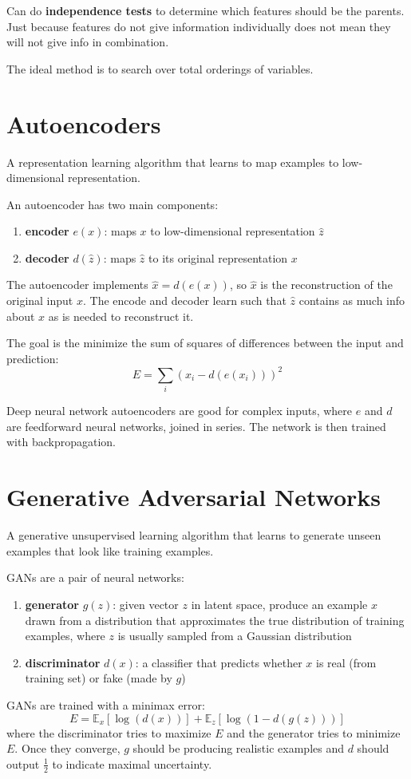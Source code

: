 \documentclass[11pt]{article}
\begin{document}
Can do \textbf{independence tests} to determine which features should be the parents.
Just because features do not give information individually does not mean they will not give info
in combination.

The ideal method is to search over total orderings of variables.
\section{Autoencoders}
\label{sec:org0c1732d}
A representation learning algorithm that learns to map examples to low-dimensional representation.

An autoencoder has two main components:
\begin{enumerate}
\item \textbf{encoder} \(e(x)\): maps \(x\) to low-dimensional representation \(\hat{z}\)
\item \textbf{decoder} \(d(\hat{z})\): maps \(\hat{z}\) to its original representation \(x\)
\end{enumerate}

The autoencoder implements \(\hat{x} = d(e(x))\), so \(\hat{x}\) is the reconstruction of the original
input \(x\).
The encode and decoder learn such that \(\hat{z}\) contains as much info about \(x\) as is needed
to reconstruct it.

The goal is the minimize the sum of squares of differences between the input and prediction:
$$ E = \sum_{i} (x_{i} - d(e(x_{i})))^{2} $$

Deep neural network autoencoders are good for complex inputs,
where \(e\) and \(d\) are feedforward neural networks, joined in series.
The network is then trained with backpropagation.
\section{Generative Adversarial Networks}
\label{sec:org511f2d1}
A generative unsupervised learning algorithm that learns to generate unseen examples that
look like training examples.

GANs are a pair of neural networks:
\begin{enumerate}
\item \textbf{generator} \(g(z)\): given vector \(z\) in latent space, produce an example \(x\) drawn from a
distribution that approximates the true distribution of training examples, where \(z\)
is usually sampled from a Gaussian distribution
\item \textbf{discriminator} \(d(x)\): a classifier that predicts whether \(x\) is real (from training set)
or fake (made by \(g\))
\end{enumerate}

GANs are trained with a minimax error:
$$ E = \mathbb{E}_{x} [ \log( d(x) )] + \mathbb{E}_{z}[ \log(1 - d(g(z)))] $$
where the discriminator tries to maximize \(E\) and the generator tries to minimize \(E\).
Once they converge, \(g\) should be producing realistic examples and \(d\) should output
\(\frac{1}{2}\) to indicate maximal uncertainty.
\end{document}
